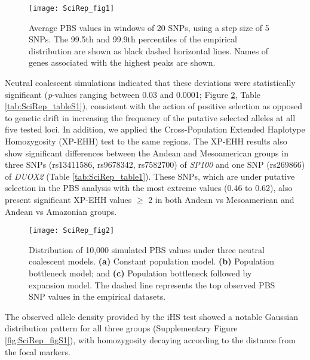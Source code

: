 \vspace{\onelineskip}



\begin{figure}[ht]
\centering
\texttt{[image: SciRep\_fig1]}
\caption[Average PBS values in windows of 20 SNPs, using a step size of 5 SNPs]{Average PBS values in windows of 20 SNPs, using a step size of 5 SNPs. The 99.5th and 99.9th percentiles of the empirical distribution are shown as black dashed horizontal lines. Names of genes associated with the highest peaks are shown.}
\label{fig:SciRep_fig1}
\end{figure}

\newpage

Neutral coalescent simulations indicated that these deviations were statistically significant (\emph{p}-values ranging between 0.03 and 0.0001; Figure \ref{fig:SciRep_fig2}, Table \ref{tab:SciRep_tableS1}), consistent with the action of positive selection as opposed to genetic drift in increasing the frequency of the putative selected alleles at all five tested loci. In addition, we applied the Cross-Population Extended Haplotype Homozygosity (XP-EHH) test to the same regions. The XP-EHH results also show significant differences between the Andean and Mesoamerican groups in three SNPs (rs13411586, rs9678342, rs7582700) of \textsl{SP100} and one SNP (rs269866) of \textsl{DUOX2} (Table \ref{tab:SciRep_table1}). These SNPs, which are under putative selection in the PBS analysis with the most extreme values (0.46 to 0.62), also present significant XP-EHH values $\geq$ 2 in both Andean vs Mesoamerican and Andean vs Amazonian groups.

\begin{figure}[p] %
\noindent
\centering
\texttt{[image: SciRep\_fig2]}
\caption[Distribution of 10,000 simulated PBS values under three neutral coalescent models]{Distribution of 10,000 simulated PBS values under three neutral coalescent models. \textbf{(a)} Constant population model. \textbf{(b)} Population bottleneck model; and \textbf{(c)} Population bottleneck followed by expansion model. The dashed line represents the top observed PBS SNP values in the empirical datasets.}
\label{fig:SciRep_fig2}
\end{figure}

The observed allele density provided by the iHS test showed a notable Gaussian distribution pattern for all three groups (Supplementary Figure \ref{fig:SciRep_figS1}), with homozygosity decaying according to the distance from the focal markers.

